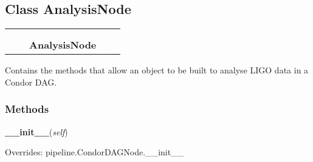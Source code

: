 

\subsection{Class AnalysisNode}

    \label{pipeline:AnalysisNode}
\begin{tabular}{cccccc}
\multicolumn{2}{r}{\settowidth{\BCL}{pipeline.CondorDAGNode}\multirow{2}{\BCL}{pipeline.CondorDAGNode}}
&&
  \\\cline{3-3}
  &&\multicolumn{1}{c|}{}
&&
  \\
&&\multicolumn{2}{l}{\textbf{AnalysisNode}}
\end{tabular}

Contains the methods that allow an object to be built to analyse LIGO 
data in a Condor DAG.



  \subsubsection{Methods}

    \label{pipeline:AnalysisNode:__init__}
    \vspace{0.5ex}

    \noindent\begin{boxedminipage}{\textwidth}

    \raggedright \textbf{\_\_init\_\_}(\textit{self})

      Overrides: pipeline.CondorDAGNode.\_\_init\_\_

    \end{boxedminipage}

    \label{pipeline:AnalysisNode:get_end}
    \vspace{0.5ex}

